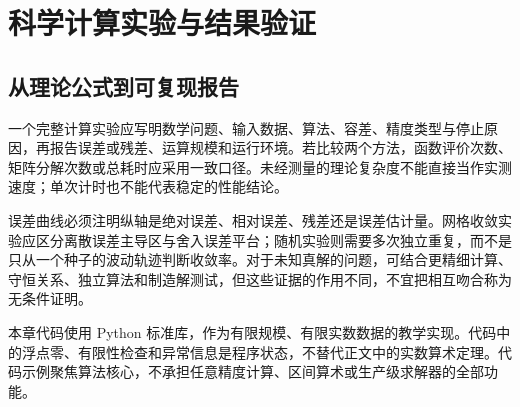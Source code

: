 \setcounter{chapter}{13} %
\chapter{科学计算实验与结果验证}
\label{chap:na-practice}

\section{从理论公式到可复现报告}
一个完整计算实验应写明数学问题、输入数据、算法、容差、精度类型与停止原因，再报告误差或残差、运算规模和运行环境。若比较两个方法，函数评价次数、矩阵分解次数或总耗时应采用一致口径。未经测量的理论复杂度不能直接当作实测速度；单次计时也不能代表稳定的性能结论。

误差曲线必须注明纵轴是绝对误差、相对误差、残差还是误差估计量。网格收敛实验应区分离散误差主导区与舍入误差平台；随机实验则需要多次独立重复，而不是只从一个种子的波动轨迹判断收敛率。对于未知真解的问题，可结合更精细计算、守恒关系、独立算法和制造解测试，但这些证据的作用不同，不宜把相互吻合称为无条件证明。

本章代码使用 Python 标准库，作为有限规模、有限实数数据的教学实现。代码中的浮点零、有限性检查和异常信息是程序状态，不替代正文中的实数算术定理。代码示例聚焦算法核心，不承担任意精度计算、区间算术或生产级求解器的全部功能。

